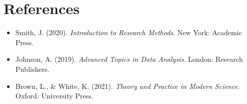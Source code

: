 \section{References}
\begin{itemize}
    \item Smith, J. (2020). \textit{Introduction to Research Methods}. New York: Academic Press.
    \item Johnson, A. (2019). \textit{Advanced Topics in Data Analysis}. London: Research Publishers.
    \item Brown, L., \& White, K. (2021). \textit{Theory and Practice in Modern Science}. Oxford: University Press.
\end{itemize}
